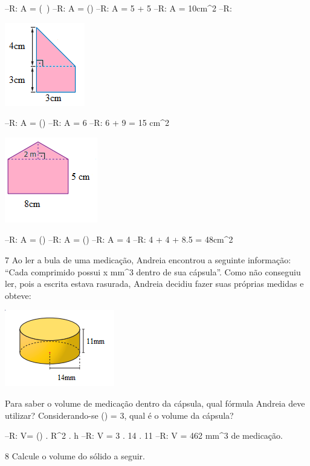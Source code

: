 {--R: A = (\ )
--R: A = ()
--R: A = 5 + 5
--R: A = 10cm^2
--R: 
\item
\includegraphics[width=1.375in,height=1.42708in]{./imgSAEB_8_MAT/media/image48.png}

--R: A = ()
--R: A = 6
--R: 6 + 9 = 15 cm^2

\item
\includegraphics[width=1.59375in,height=1.46875in]{./imgSAEB_8_MAT/media/image49.png}

--R: A = ()
--R: A = ()
--R: A = 4
--R: 4 + 4 + 8.5 = 48cm^2

\num{7} Ao ler a bula de uma medicação, Andreia encontrou a seguinte
informação: ``Cada comprimido possui x mm^3 dentro de sua cápsula''. Como
não conseguiu ler, pois a escrita estava rasurada, Andreia decidiu fazer
suas próprias medidas e obteve:

\includegraphics[width=1.88542in,height=1.3125in]{./imgSAEB_8_MAT/media/image50.png}

Para saber o volume de medicação dentro da cápsula, qual fórmula Andreia deve utilizar?
Considerando-se (\Pi) = 3, qual é o volume da cápsula?

--R: V= (\Pi) . R^2 . h
--R: V = 3 . 14 . 11
--R: V = 462 mm^3 de medicação.

\num{8} Calcule o volume do sólido a seguir.

}
